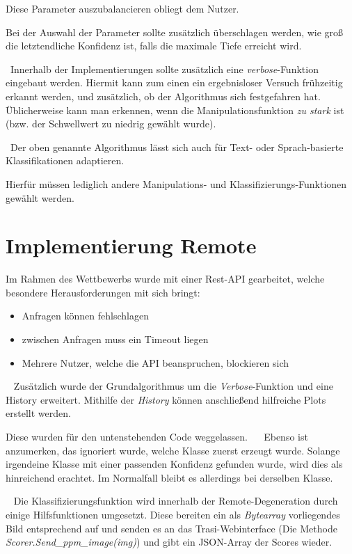 Diese Parameter auszubalancieren obliegt dem Nutzer. 

Bei der Auswahl der Parameter sollte zusätzlich überschlagen werden, wie groß die letztendliche Konfidenz ist, falls die maximale Tiefe erreicht wird. 

~\newline Innerhalb der Implementierungen sollte zusätzlich eine \textit{verbose}-Funktion eingebaut werden. Hiermit kann zum einen ein ergebnisloser Versuch frühzeitig erkannt werden, und zusätzlich, ob der Algorithmus sich festgefahren hat. Üblicherweise kann man erkennen, wenn die Manipulationsfunktion \textit{zu stark} ist (bzw. der Schwellwert zu niedrig gewählt wurde).

~\newline Der oben genannte Algorithmus lässt sich auch für Text- oder Sprach-basierte Klassifikationen adaptieren. 

Hierfür müssen lediglich andere Manipulations- und Klassifizierungs-Funktionen gewählt werden.
\newpage
\section{Implementierung Remote}
Im Rahmen des Wettbewerbs wurde mit einer Rest-API  gearbeitet, welche besondere Herausforderungen mit sich bringt: 

\begin{itemize}
	\item Anfragen können fehlschlagen
	\item zwischen Anfragen muss ein Timeout liegen
	\item Mehrere Nutzer, welche die API beanspruchen, blockieren sich
\end{itemize}
~\newline
Zusätzlich wurde der Grundalgorithmus um die \textit{Verbose}-Funktion und eine History erweitert. Mithilfe der \textit{History} können anschließend hilfreiche Plots erstellt werden. 

Diese wurden für den untenstehenden Code weggelassen.
~\newline~\newline
Ebenso ist anzumerken, das ignoriert wurde, welche Klasse zuerst erzeugt wurde. Solange irgendeine Klasse mit einer passenden Konfidenz gefunden wurde, wird dies als hinreichend erachtet. Im Normalfall bleibt es allerdings bei derselben Klasse. 

~\newline 
Die Klassifizierungsfunktion wird innerhalb der Remote-Degeneration durch einige Hilfsfunktionen umgesetzt. Diese bereiten ein als \textit{Bytearray} vorliegendes Bild entsprechend auf und senden es an das Trasi-Webinterface (Die Methode \textit{Scorer.Send\_ppm\_image(img)}) und gibt ein JSON-Array der Scores wieder. 

